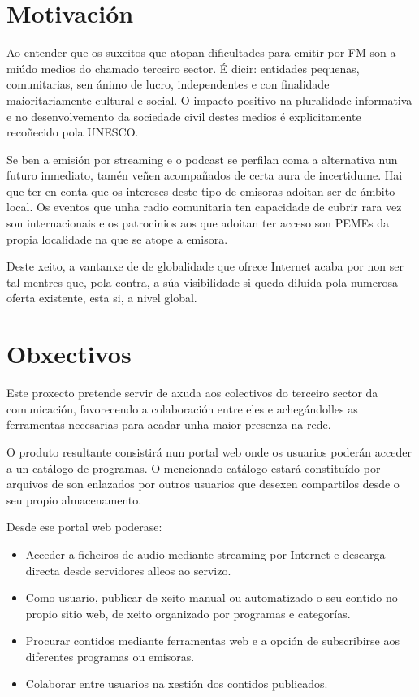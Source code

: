\section{Motivación}

Ao entender que os suxeitos que atopan dificultades para emitir por FM son a miúdo medios do chamado terceiro sector. É dicir: entidades pequenas, comunitarias, sen ánimo de lucro, independentes e con finalidade maioritariamente cultural e social\cite{fesp}. O impacto positivo na pluralidade informativa e no desenvolvemento da sociedade civil destes medios é explicitamente recoñecido pola UNESCO\cite{unesco}. 

Se ben a emisión por streaming e o podcast se perfilan coma a alternativa nun futuro inmediato, tamén veñen acompañados de certa aura de incertidume. Hai que ter en conta que os intereses deste tipo de emisoras adoitan ser de ámbito local. Os eventos que unha radio comunitaria ten capacidade de cubrir rara vez son internacionais e os patrocinios aos que adoitan ter acceso son PEMEs da propia localidade na que se atope a emisora. 

Deste xeito, a vantanxe de de globalidade que ofrece Internet acaba por non ser tal mentres que, pola contra, a súa visibilidade si queda diluída pola numerosa oferta existente, esta si, a nivel global.



\section{Obxectivos}

Este proxecto pretende servir de axuda aos colectivos do terceiro sector da comunicación, favorecendo a colaboración entre eles e achegándolles as ferramentas necesarias para acadar unha maior presenza na rede.

O produto resultante consistirá nun portal web onde os usuarios poderán acceder a un catálogo de programas. O mencionado catálogo estará constituído por arquivos de son enlazados por outros usuarios que desexen compartilos desde o seu propio almacenamento.

Desde ese portal web poderase:
\begin{itemize}
\item Acceder a ficheiros de audio mediante streaming por Internet e descarga directa desde servidores alleos ao servizo.
\item Como usuario, publicar de xeito manual ou automatizado o seu contido no propio sitio web, de xeito organizado por programas e categorías. 
\item Procurar contidos mediante ferramentas web e a opción de subscribirse aos diferentes programas ou emisoras.
\item Colaborar entre usuarios na xestión dos contidos publicados.
\end{itemize}
